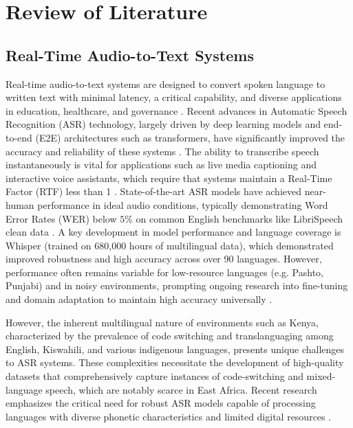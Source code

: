 \chapter{Review of Literature}
\section{Real-Time Audio-to-Text Systems}
Real-time audio-to-text systems are designed to convert spoken language to written text with minimal latency, a critical capability, and diverse applications in education, healthcare, and governance \cite{Kheddar2024AdvancedDL}. Recent advances in Automatic Speech Recognition (ASR) technology, largely driven by deep learning models and end-to-end (E2E) architectures such as transformers, have significantly improved the accuracy and reliability of these systems \cite{Sainz2024Realtime}. The ability to transcribe speech instantaneously is vital for applications such as live media captioning and interactive voice assistants, which require that systems maintain a Real-Time Factor (RTF) less than 1 \cite{Sainz2024Realtime}. State-of-the-art ASR models have achieved near-human performance in ideal audio conditions, typically demonstrating Word Error Rates (WER) below $5\%$ on common English benchmarks like LibriSpeech clean data \cite{Radford2023Whisper}. A key development in model performance and language coverage is Whisper (trained on 680,000 hours of multilingual data), which demonstrated improved robustness and high accuracy across over 90 languages. However, performance often remains variable for low-resource languages (e.g. Pashto, Punjabi) and in noisy environments, prompting ongoing research into fine-tuning and domain adaptation to maintain high accuracy universally \cite{Sehar2025LowResource}.

\noindent However, the inherent multilingual nature of environments such as Kenya, characterized by the prevalence of code switching and translanguaging among English, Kiswahili, and various indigenous languages, presents unique challenges to ASR systems. These complexities necessitate the development of high-quality datasets that comprehensively capture instances of code-switching and mixed-language speech, which are notably scarce in East Africa. Recent research emphasizes the critical need for robust ASR models capable of processing languages with diverse phonetic characteristics and limited digital resources \cite{s23229096}.

